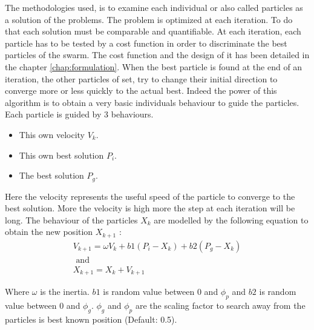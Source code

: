 The methodologies used, is to examine each individual or also called particles as a solution of the problems. The problem is optimized at each iteration. To do that each solution must be comparable and quantifiable. At each iteration, each particle has to be tested by a cost function in order to discriminate the best particles of the swarm. The cost function and the design of it has been detailed in the chapter \ref{chap:formulation}.
When the best particle is found at the end of an iteration, the other particles of set, try to change their initial direction to converge more or less quickly to the actual best. 
Indeed the power of this algorithm is to obtain a very basic individuals behaviour to guide the particles. 
Each particle is guided by 3 behaviours.
 \begin{itemize}
 \item  This own velocity $V_k$. 
 \item  This own best solution $P_i$.
 \item  The best solution $P_g$.
\end{itemize}  
Here the velocity represents the useful speed of the particle to converge to the best solution. More the velocity is high more the step at each iteration will be long. 
The behaviour of the particles $X_k$ are modelled by the following equation to obtain the new position $X_{k+1}$ :
\begin{equation} \label{eq:PSO}
\begin{split}
 V_{k+1}= \omega V_k +b1(P_i -X_k)+b2(P_g-X_k)
\\
\mbox{ and } \\ X_{k+1}=X_k+V_{k+1}
\end{split}
\end{equation}

Where $\omega$ is the inertia. $b1$ is random value between 0 and $\phi_p$ and $b2$ is random value between 0 and $\phi_g$. $\phi_g$ and $\phi_p$  are the scaling factor to search away from the particles is best known position (Default: 0.5). 

